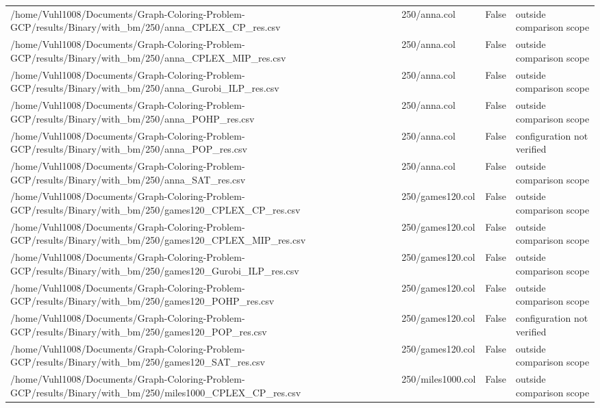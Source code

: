 \begin{table}[htbp]
\begin{tabular}{llll}
/home/Vuhl1008/Documents/Graph-Coloring-Problem-GCP/results/Binary/with\_bm/250/anna\_CPLEX\_CP\_res.csv & 250/anna.col & False & outside comparison scope \\
/home/Vuhl1008/Documents/Graph-Coloring-Problem-GCP/results/Binary/with\_bm/250/anna\_CPLEX\_MIP\_res.csv & 250/anna.col & False & outside comparison scope \\
/home/Vuhl1008/Documents/Graph-Coloring-Problem-GCP/results/Binary/with\_bm/250/anna\_Gurobi\_ILP\_res.csv & 250/anna.col & False & outside comparison scope \\
/home/Vuhl1008/Documents/Graph-Coloring-Problem-GCP/results/Binary/with\_bm/250/anna\_POHP\_res.csv & 250/anna.col & False & outside comparison scope \\
/home/Vuhl1008/Documents/Graph-Coloring-Problem-GCP/results/Binary/with\_bm/250/anna\_POP\_res.csv & 250/anna.col & False & configuration not verified \\
/home/Vuhl1008/Documents/Graph-Coloring-Problem-GCP/results/Binary/with\_bm/250/anna\_SAT\_res.csv & 250/anna.col & False & outside comparison scope \\
/home/Vuhl1008/Documents/Graph-Coloring-Problem-GCP/results/Binary/with\_bm/250/games120\_CPLEX\_CP\_res.csv & 250/games120.col & False & outside comparison scope \\
/home/Vuhl1008/Documents/Graph-Coloring-Problem-GCP/results/Binary/with\_bm/250/games120\_CPLEX\_MIP\_res.csv & 250/games120.col & False & outside comparison scope \\
/home/Vuhl1008/Documents/Graph-Coloring-Problem-GCP/results/Binary/with\_bm/250/games120\_Gurobi\_ILP\_res.csv & 250/games120.col & False & outside comparison scope \\
/home/Vuhl1008/Documents/Graph-Coloring-Problem-GCP/results/Binary/with\_bm/250/games120\_POHP\_res.csv & 250/games120.col & False & outside comparison scope \\
/home/Vuhl1008/Documents/Graph-Coloring-Problem-GCP/results/Binary/with\_bm/250/games120\_POP\_res.csv & 250/games120.col & False & configuration not verified \\
/home/Vuhl1008/Documents/Graph-Coloring-Problem-GCP/results/Binary/with\_bm/250/games120\_SAT\_res.csv & 250/games120.col & False & outside comparison scope \\
/home/Vuhl1008/Documents/Graph-Coloring-Problem-GCP/results/Binary/with\_bm/250/miles1000\_CPLEX\_CP\_res.csv & 250/miles1000.col & False & outside comparison scope \\

\end{tabular}
\end{table}
